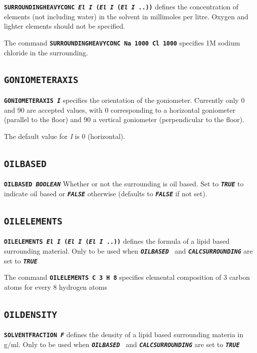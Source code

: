\documentclass[a4paper]{article}
\newcommand{\Keyword}[1]{\texttt{\textbf{#1}}\xspace}
\begin{document}
\noindent \Keyword{SURROUNDINGHEAVYCONC \textit{El I} (\textit{El I} (\textit{El I} ..))}
defines the concentration of elements (not including water) in the solvent in millimoles per litre. Oxygen and lighter elements should not be specified.

The command \Keyword{SURROUNDINGHEAVYCONC Na 1000 Cl 1000} specifies 1M sodium chloride in the surrounding.


\subsection{\Keyword{GONIOMETERAXIS}}
\label{goniometeraxis}

\noindent \Keyword{GONIOMETERAXIS \textit{I}}
specifies the orientation of the goniometer. Currently only 0 and 90 are accepted values, with 0 corresponding to a horizontal
goniometer (parallel to the floor) and 90 a vertical goniometer (perpendicular to the floor).

The default value for \textit{I} is 0 (horizontal).

\subsection{\Keyword{OILBASED}}
\label{oilbased}

\noindent \Keyword{OILBASED \textit{BOOLEAN}}
Whether or not the surrounding is oil based. Set to \Keyword{\textit{TRUE}} to indicate oil based or \Keyword{\textit{FALSE}} otherwise (defaults to \Keyword{\textit{FALSE}} if not set).

\subsection{\Keyword{OILELEMENTS}}
\label{oilelements}

\noindent \Keyword{OILELEMENTS  \textit{El I} (\textit{El I} (\textit{El I} ..))}
defines the formula of a lipid based surrounding material. Only to be used when \Keyword{\textit{OILBASED }} and \Keyword{\textit{CALCSURROUNDING}} are set to \Keyword{\textit{TRUE}}

The command \Keyword{OILELEMENTS C 3 H 8} specifies elemental composition of 3 carbon atoms for every 8 hydrogen atoms

\subsection{\Keyword{OILDENSITY}}
\label{oildensity}
\noindent \Keyword{SOLVENTFRACTION \textit{F}}
defines the density of a lipid based surrounding materia in g/ml. Only to be used when \Keyword{\textit{OILBASED }} and \Keyword{\textit{CALCSURROUNDING}} are set to \Keyword{\textit{TRUE}}
\end{document}

